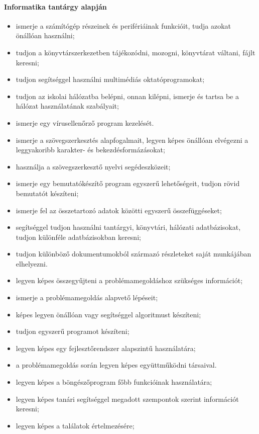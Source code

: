 \paragraph{Informatika tantárgy alapján}
\begin{itemize}
\item ismerje a számítógép részeinek és perifériáinak funkcióit, tudja azokat önállóan használni;
\item tudjon a könyvtárszerkezetben tájékozódni, mozogni, könyvtárat váltani, fájlt keresni;
\item tudjon segítséggel használni multimédiás oktatóprogramokat;
\item tudjon az iskolai hálózatba belépni, onnan kilépni, ismerje és tartsa be a hálózat használatának szabályait;
\item ismerje egy vírusellenőrző program kezelését.
\item ismerje a szövegszerkesztés alapfogalmait, legyen képes önállóan elvégezni a leggyakoribb karakter- és bekezdésformázásokat;
\item használja a szövegszerkesztő nyelvi segédeszközeit;
\item ismerje egy bemutatókészítő program egyszerű lehetőségeit, tudjon rövid bemutatót készíteni;
\item ismerje fel az összetartozó adatok közötti egyszerű összefüggéseket;
\item segítséggel tudjon használni tantárgyi, könyvtári, hálózati adatbázisokat, tudjon különféle adatbázisokban keresni;
\item tudjon különböző dokumentumokból származó részleteket saját munkájában elhelyezni.
\item legyen képes összegyűjteni a problémamegoldáshoz szükséges információt;
\item ismerje a problémamegoldás alapvető lépéseit;
\item képes legyen önállóan vagy segítséggel algoritmust készíteni;
\item tudjon egyszerű programot készíteni;
\item legyen képes egy fejlesztőrendszer alapszintű használatára;
\item a problémamegoldás során legyen képes együttműködni társaival.
\item legyen képes a böngészőprogram főbb funkcióinak használatára;
\item legyen képes tanári segítséggel megadott szempontok szerint információt keresni;
\item legyen képes a találatok értelmezésére;

\end{itemize}
